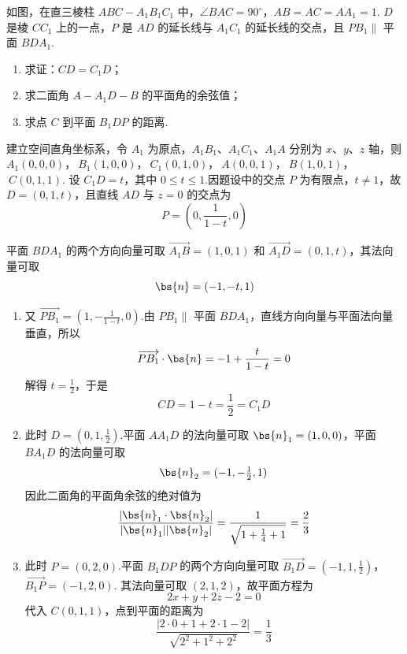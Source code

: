 \begin{problem}
如图，在直三棱柱 \(ABC - A_{1}B_{1}C_{1}\) 中，\(\angle BAC = 90^{\circ}\)，\(AB = AC = AA_{1} = 1\). \(D\) 是棱 \(CC_{1}\) 上的一点，\(P\) 是 \(AD\) 的延长线与 \(A_{1}C_{1}\) 的延长线的交点，且 \(PB_{1} \parallel\) 平面 \(BDA_{1}\).
\begin{enumerate}
\item 求证：\(CD = C_{1}D\)；
\item 求二面角 \(A - A_{1}D - B\) 的平面角的余弦值；
\item 求点 \(C\) 到平面 \(B_{1}DP\) 的距离.
\end{enumerate}

\end{problem}

\begin{solution}
建立空间直角坐标系，令 \(A_{1}\) 为原点，\(A_{1}B_{1}\)、\(A_{1}C_{1}\)、\(A_{1}A\) 分别为 \(x\)、\(y\)、\(z\) 轴，则
\(A_{1}(0,0,0)\)，\(\ B_{1}(1,0,0)\)，\(\ C_{1}(0,1,0)\)，\(\ A(0,0,1)\)，\(\ B(1,0,1)\)，\(\ C(0,1,1)\).
设 \(C_{1}D=t\)，其中 \(0\leqslant t\leqslant1\).因题设中的交点 \(P\) 为有限点，\(t\ne1\)，故 \(D=(0,1,t)\)，且直线 \(AD\) 与 \(z=0\) 的交点为
\[
P=\left(0,\frac{1}{1-t},0\right)
\]

平面 \(BDA_{1}\) 的两个方向向量可取 \(\overrightarrow{A_{1}B}=(1,0,1)\) 和 \(\overrightarrow{A_{1}D}=(0,1,t)\)，其法向量可取
\[
\bs{n}=(-1,-t,1)
\]
\begin{enumerate}
\item 又 \(\overrightarrow{PB_{1}}=\left(1,-\frac{1}{1-t},0\right)\).由 \(PB_{1}\parallel\) 平面 \(BDA_{1}\)，直线方向向量与平面法向量垂直，所以
\[
\overrightarrow{PB_{1}}\cdot\bs{n}=-1+\frac{t}{1-t}=0
\]
解得 \(t=\frac12\)，于是
\[
CD=1-t=\frac12=C_{1}D
\]

\item 此时 \(D=(0,1,\frac12)\).平面 \(AA_{1}D\) 的法向量可取 \(\bs{n}_{1}=(1,0,0)\)，平面 \(BA_{1}D\) 的法向量可取
\[
\bs{n}_{2}=(-1,-\tfrac12,1)
\]
因此二面角的平面角余弦的绝对值为
\[
\frac{|\bs{n}_{1}\cdot\bs{n}_{2}|}{|\bs{n}_{1}||\bs{n}_{2}|}
 =\frac{1}{\sqrt{1+\frac14+1}}=\frac23
\]

\item 此时 \(P=(0,2,0)\).平面 \(B_{1}DP\) 的两个方向向量可取
\(\overrightarrow{B_{1}D}=\left(-1,1,\frac12\right)\)，\(\overrightarrow{B_{1}P}=(-1,2,0)\).
其法向量可取 \((2,1,2)\)，故平面方程为
\[
2x+y+2z-2=0
\]
代入 \(C(0,1,1)\)，点到平面的距离为
\[
\frac{|2\cdot0+1+2\cdot1-2|}{\sqrt{2^2+1^2+2^2}}=\frac13
\]
\end{enumerate}
\end{solution}

